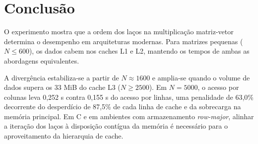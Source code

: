 \documentclass[11pt,letterpaper]{article}
\begin{document}
\section{Conclusão}

O experimento mostra que a ordem dos laços na multiplicação matriz-vetor determina o desempenho em arquiteturas modernas. Para matrizes pequenas ($N \le 600$), os dados cabem nos caches L1 e L2, mantendo os tempos de ambas as abordagens equivalentes.

A divergência estabiliza-se a partir de $N \approx 1600$ e amplia-se quando o volume de dados supera os 33 MiB do cache L3 ($N \ge 2500$). Em $N=5000$, o acesso por colunas leva 0,252 s contra 0,155 s do acesso por linhas, uma penalidade de 63,0\% decorrente do desperdício de 87,5\% de cada linha de cache e da sobrecarga na memória principal. Em C e em ambientes com armazenamento \textit{row-major}, alinhar a iteração dos laços à disposição contígua da memória é necessário para o aproveitamento da hierarquia de cache.
\end{document}
